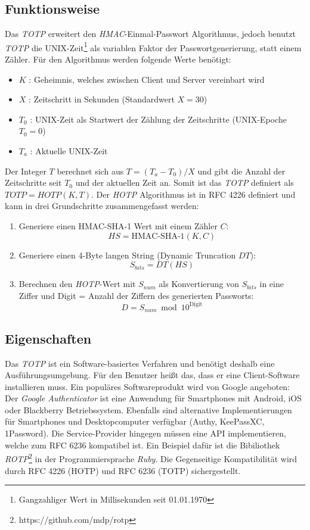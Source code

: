 \documentclass[11pt,a4paper,ngerman]{scrreprt}
\begin{document}
\subsection{Funktionsweise}
Das \textit{TOTP} erweitert den \textit{HMAC}-Einmal-Passwort Algorithmus, jedoch benutzt \textit{TOTP} die UNIX-Zeit\footnote{Gangzahliger Wert in Millisekunden seit 01.01.1970} als variablen Faktor der Passwortgenerierung, statt einem Zähler. Für den Algorithmus werden folgende Werte benötigt:
\begin{itemize}
    \item $K$ : Geheimnis, welches zwischen Client und Server vereinbart wird
    \item $X$ : Zeitschritt in Sekunden (Standardwert $X = 30$)
    \item $T_0$ : UNIX-Zeit als Startwert der Zählung der Zeitschritte (UNIX-Epoche $T_0 = 0$)
    \item $T_a$ : Aktuelle UNIX-Zeit
\end{itemize}
Der Integer $T$ berechnet sich aus $T = (T_a - T_0) / X$ und gibt die Anzahl der Zeitschritte seit $T_0$ und der aktuellen Zeit an. Somit ist das \textit{TOTP} definiert als $TOTP = HOTP(K, T)$. Der \textit{HOTP} Algorithmus ist in RFC 4226 \cite{rfc4226} definiert und kann in drei Grundschritte zusammengefasst werden:
\begin{enumerate}
    \item Generiere einen HMAC-SHA-1 Wert mit einem Zähler $C$: 
    \[
        HS = \textrm{HMAC-SHA-1}(K, C)
    \]
    \item Generiere einen 4-Byte langen String (Dynamic Truncation $DT$): 
    \[
        S_{bits} = DT(HS)
    \]
    \item Berechnen den \textit{HOTP}-Wert mit $S_{num}$ als Konvertierung von $S_{bits}$ in eine Ziffer und Digit = Anzahl der Ziffern des generierten Passworts:
    \[
        D = S_{num} \bmod 10^{\textrm{Digit}}
    \]
\end{enumerate}
\subsection{Eigenschaften}
Das \textit{TOTP} ist ein Software-basiertes Verfahren und benötigt deshalb eine Ausführungsumgebung. Für den Benutzer heißt das, dass er eine Client-Software installieren muss. Ein populäres Softwareprodukt wird von Google angeboten: Der \textit{Google Authenticator} ist eine Anwendung für Smartphones mit Android, iOS oder Blackberry Betriebssystem. Ebenfalls sind alternative Implementierungen für Smartphones und Desktopcomputer verfügbar (Authy, KeePassXC, 1Password). Die Service-Provider hingegen müssen eine API implementieren, welche zum RFC 6236 kompatibel ist. Ein Beispiel dafür ist die Bibiliothek \textit{ROTP}\footnote{https://github.com/mdp/rotp} in der Programmiersprache \textit{Ruby}. Die Gegenseitige Kompatibilität wird durch RFC 4226 (HOTP) und RFC 6236 (TOTP) sichergestellt.
\end{document}
